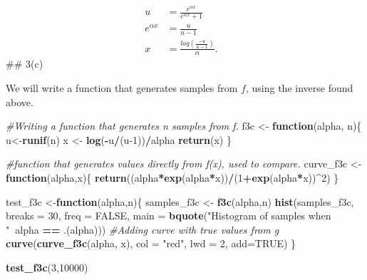 \documentclass[
]{article}
\newenvironment{Shaded}{\begin{snugshade}}{\end{snugshade}}
\newcommand{\CommentTok}[1]{\textcolor[rgb]{0.56,0.35,0.01}{\textit{#1}}}
\newcommand{\ControlFlowTok}[1]{\textcolor[rgb]{0.13,0.29,0.53}{\textbf{#1}}}
\newcommand{\DataTypeTok}[1]{\textcolor[rgb]{0.13,0.29,0.53}{#1}}
\newcommand{\DecValTok}[1]{\textcolor[rgb]{0.00,0.00,0.81}{#1}}
\newcommand{\KeywordTok}[1]{\textcolor[rgb]{0.13,0.29,0.53}{\textbf{#1}}}
\newcommand{\NormalTok}[1]{#1}
\newcommand{\OperatorTok}[1]{\textcolor[rgb]{0.81,0.36,0.00}{\textbf{#1}}}
\newcommand{\OtherTok}[1]{\textcolor[rgb]{0.56,0.35,0.01}{#1}}
\newcommand{\StringTok}[1]{\textcolor[rgb]{0.31,0.60,0.02}{#1}}
\begin{document}
\[
\begin{aligned}
u&=\frac{e^{\alpha x}}{e^{\alpha x}+1}\\
e^{\alpha x }&=\frac{u}{u-1}&\\
x&=\frac{log(\frac{-u}{u-1})}{\alpha}.
\end{aligned}
\] \#\# 3(c)

We will write a function that generates samples from \(f\), using the
inverse found above.

\begin{Shaded}
\begin{Highlighting}[]
\CommentTok{#Writing a function that generates n samples from f.}
\NormalTok{f3c <-}\StringTok{ }\ControlFlowTok{function}\NormalTok{(alpha, n)\{}
\NormalTok{    u<-}\KeywordTok{runif}\NormalTok{(n)}
\NormalTok{    x <-}\StringTok{ }\KeywordTok{log}\NormalTok{(}\OperatorTok{-}\NormalTok{u}\OperatorTok{/}\NormalTok{(u}\DecValTok{-1}\NormalTok{))}\OperatorTok{/}\NormalTok{alpha}
    \KeywordTok{return}\NormalTok{(x)}
\NormalTok{\}}

\CommentTok{#function that generates values directly from f(x), used to compare.}
\NormalTok{curve_f3c <-}\ControlFlowTok{function}\NormalTok{(alpha,x)\{}
  \KeywordTok{return}\NormalTok{((alpha}\OperatorTok{*}\KeywordTok{exp}\NormalTok{(alpha}\OperatorTok{*}\NormalTok{x))}\OperatorTok{/}\NormalTok{(}\DecValTok{1}\OperatorTok{+}\KeywordTok{exp}\NormalTok{(alpha}\OperatorTok{*}\NormalTok{x))}\OperatorTok{^}\DecValTok{2}\NormalTok{)}
\NormalTok{\}}

\NormalTok{test_f3c <-}\ControlFlowTok{function}\NormalTok{(alpha,n)\{}
\NormalTok{  samples_f3c <-}\StringTok{ }\KeywordTok{f3c}\NormalTok{(alpha,n)}
  \KeywordTok{hist}\NormalTok{(samples_f3c, }\DataTypeTok{breaks =} \DecValTok{30}\NormalTok{, }\DataTypeTok{freq =} \OtherTok{FALSE}\NormalTok{, }\DataTypeTok{main =} \KeywordTok{bquote}\NormalTok{(}\StringTok{"Histogram of samples when "}\OperatorTok{~}\NormalTok{alpha }\OperatorTok{==}\StringTok{ }\NormalTok{.(alpha)))}
  \CommentTok{#Adding curve with true values from g}
  \KeywordTok{curve}\NormalTok{(}\KeywordTok{curve_f3c}\NormalTok{(alpha, x), }\DataTypeTok{col =} \StringTok{"red"}\NormalTok{, }\DataTypeTok{lwd =} \DecValTok{2}\NormalTok{, }\DataTypeTok{add=}\OtherTok{TRUE}\NormalTok{)}
\NormalTok{\}}

\KeywordTok{test_f3c}\NormalTok{(}\DecValTok{3}\NormalTok{,}\DecValTok{10000}\NormalTok{)}
\end{Highlighting}
\end{Shaded}
\end{document}
